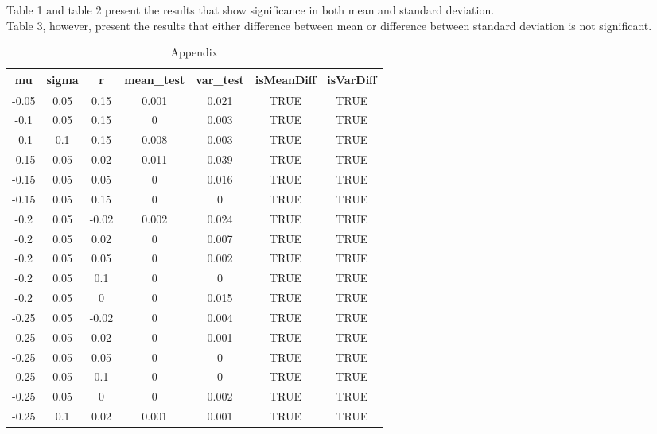 \documentclass[
10pt, %
a4paper, %
oneside, %
headinclude,footinclude, %
BCOR5mm, %
]{scrartcl}
\begin{document}
Table 1 and table 2 present the results that show significance in both mean and standard deviation.\\

Table 3, however, present the results that either difference between mean or difference between standard deviation is not significant.
\begin{table}[H]
	\centering
	\caption{Appendix}
	\label{my-label}
	\begin{tabular}{|c|c|c|c|c|c|c|}
		\hline
		mu    & sigma & r     & mean\_test & var\_test & isMeanDiff & isVarDiff \\
		\hline
		-0.05 & 0.05  & 0.15  & 0.001      & 0.021     & TRUE       & TRUE      \\
		-0.1  & 0.05  & 0.15  & 0          & 0.003     & TRUE       & TRUE      \\
		-0.1  & 0.1   & 0.15  & 0.008      & 0.003     & TRUE       & TRUE      \\
		-0.15 & 0.05  & 0.02  & 0.011      & 0.039     & TRUE       & TRUE      \\
		-0.15 & 0.05  & 0.05  & 0          & 0.016     & TRUE       & TRUE      \\
		-0.15 & 0.05  & 0.15  & 0          & 0         & TRUE       & TRUE      \\
		-0.2  & 0.05  & -0.02 & 0.002      & 0.024     & TRUE       & TRUE      \\
		-0.2  & 0.05  & 0.02  & 0          & 0.007     & TRUE       & TRUE      \\
		-0.2  & 0.05  & 0.05  & 0          & 0.002     & TRUE       & TRUE      \\
		-0.2  & 0.05  & 0.1   & 0          & 0         & TRUE       & TRUE      \\
		-0.2  & 0.05  & 0     & 0          & 0.015     & TRUE       & TRUE      \\
		-0.25 & 0.05  & -0.02 & 0          & 0.004     & TRUE       & TRUE      \\
		-0.25 & 0.05  & 0.02  & 0          & 0.001     & TRUE       & TRUE      \\
		-0.25 & 0.05  & 0.05  & 0          & 0         & TRUE       & TRUE      \\
		-0.25 & 0.05  & 0.1   & 0          & 0         & TRUE       & TRUE      \\
		-0.25 & 0.05  & 0     & 0          & 0.002     & TRUE       & TRUE      \\
		-0.25 & 0.1   & 0.02  & 0.001      & 0.001     & TRUE       & TRUE      \\

\end{tabular}
\end{table}
\end{document}
